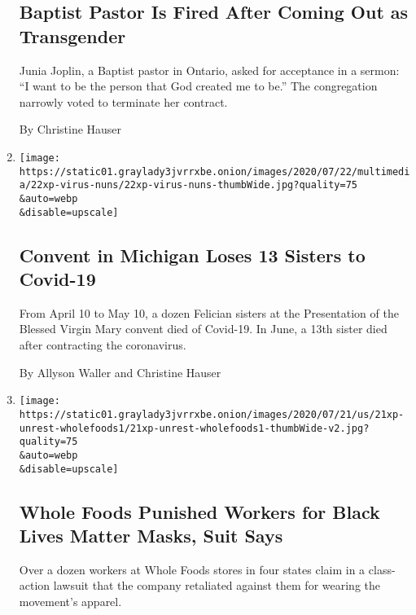 \begin{enumerate}
{  \subsection{Baptist Pastor Is Fired After Coming Out as
  Transgender}\label{baptist-pastor-is-fired-after-coming-out-as-transgender}}

  Junia Joplin, a Baptist pastor in Ontario, asked for acceptance in a
  sermon: ``I want to be the person that God created me to be.'' The
  congregation narrowly voted to terminate her contract.

  By Christine Hauser
\item
  \href{/2020/07/23/us/nuns-die-covid-michigan.html}{}

  \texttt{[image: https://static01.graylady3jvrrxbe.onion/images/2020/07/22/multimedia/22xp-virus-nuns/22xp-virus-nuns-thumbWide.jpg?quality=75\\\&auto=webp\\\&disable=upscale]}

  \hypertarget{convent-in-michigan-loses-13-sisters-to-covid-19}{%
  \subsection{Convent in Michigan Loses 13 Sisters to
  Covid-19}\label{convent-in-michigan-loses-13-sisters-to-covid-19}}

  From April 10 to May 10, a dozen Felician sisters at the Presentation
  of the Blessed Virgin Mary convent died of Covid-19. In June, a 13th
  sister died after contracting the coronavirus.

  By Allyson Waller and Christine Hauser
\item
  \href{/2020/07/21/business/whole-foods-black-lives-matter.html}{}

  \texttt{[image: https://static01.graylady3jvrrxbe.onion/images/2020/07/21/us/21xp-unrest-wholefoods1/21xp-unrest-wholefoods1-thumbWide-v2.jpg?quality=75\\\&auto=webp\\\&disable=upscale]}

  \hypertarget{whole-foods-punished-workers-for-black-lives-matter-masks-suit-says}{%
  \subsection{Whole Foods Punished Workers for Black Lives Matter Masks,
  Suit
  Says}\label{whole-foods-punished-workers-for-black-lives-matter-masks-suit-says}}

  Over a dozen workers at Whole Foods stores in four states claim in a
  class-action lawsuit that the company retaliated against them for
  wearing the movement's apparel.


\end{enumerate}

